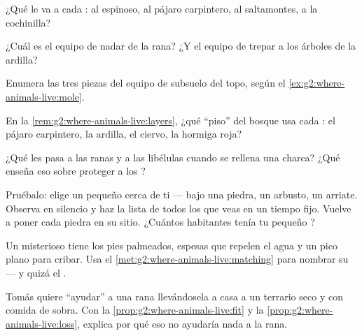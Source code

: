 \begin{exercise}[$\star$]\label{exo:g2:where-animals-live:3}
¿Qué  le va a cada : al espinoso, al pájaro carpintero,
al saltamontes, a la cochinilla?
\end{exercise}

\begin{exercise}[$\star$]\label{exo:g2:where-animals-live:4}
¿Cuál es el equipo de nadar de la rana? ¿Y el equipo de trepar a los
árboles de la ardilla?
\end{exercise}

\begin{exercise}[$\star$]\label{exo:g2:where-animals-live:5}
Enumera las tres piezas del equipo de subsuelo del topo, según el
\cref{ex:g2:where-animals-live:mole}.
\end{exercise}

\begin{exercise}[$\star$]\label{exo:g2:where-animals-live:6}
En la \cref{rem:g2:where-animals-live:layers}, ¿qué ``piso'' del
bosque usa cada : el pájaro carpintero, la ardilla, el ciervo,
la hormiga roja?
\end{exercise}

\begin{exercise}[$\star$]\label{exo:g2:where-animals-live:7}
¿Qué les pasa a las ranas y a las libélulas cuando se rellena una
charca? ¿Qué enseña eso sobre proteger a los ?
\end{exercise}

\begin{exercise}[$\star$]\label{exo:g2:where-animals-live:8}
Pruébalo: elige un  pequeño cerca de ti --- bajo una piedra, un
arbusto, un arriate. Observa en silencio y haz la lista de todos los
 que veas en un tiempo fijo. Vuelve a poner cada piedra en su
sitio. ¿Cuántos habitantes tenía tu pequeño ?
\end{exercise}

\begin{exercise}[$\star\star$]\label{exo:g2:where-animals-live:9}
Un  misterioso tiene los pies palmeados,  espesas que
repelen el agua y un pico plano para cribar. Usa el
\cref{met:g2:where-animals-live:matching} para nombrar su  ---
y quizá el .
\end{exercise}

\begin{exercise}[$\star\star$]\label{exo:g2:where-animals-live:10}
Tomás quiere ``ayudar'' a una rana llevándosela a casa a un terrario
seco y con comida de sobra. Con la
\cref{prop:g2:where-animals-live:fit} y la
\cref{prop:g2:where-animals-live:loss}, explica por qué eso no
ayudaría nada a la rana.
\end{exercise}
